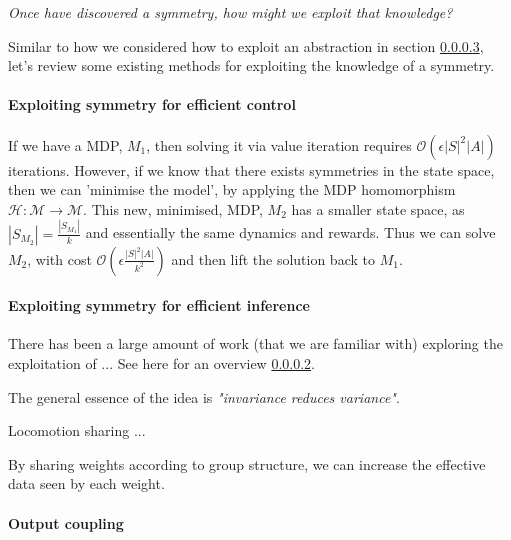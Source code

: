 \begin{displayquote}
\textsl{Once have discovered a symmetry, how might we exploit that knowledge?}
\end{displayquote}

Similar to how we considered how to exploit an abstraction in section \ref{},
let's review some existing methods for exploiting the knowledge of a symmetry. \footnotemark[22]



\paragraph{Exploiting symmetry for efficient control}

If we have a MDP, $M_1$, then solving it via value iteration requires $\mathcal O(\epsilon |S|^2|A|)$ iterations.
However, if we know that there exists symmetries in the state space, then we can 'minimise the model',
by applying the MDP homomorphism $\mathcal H: \mathcal M\to \mathcal M$.
This new, minimised, MDP, $M_2$ has a smaller state space, as $|S_{M_2}| = \frac{|S_{M_1}|}{k}$
and essentially the same dynamics and rewards. Thus we can solve $M_2$, with cost $\mathcal O(\epsilon \frac{|S|^2|A|}{k^2})$
and then lift the solution back to $M_1$. \cite{Dean1997, NARAYANAMURTHY}


\paragraph{Exploiting symmetry for efficient inference}\label{symmetry-inference}

There has been a large amount of work (that we are familiar with) exploring
the exploitation of ... See  here for an overview \ref{symmetry-inference}.

The general essence of the idea is \textit{"invariance reduces variance"}. \cite{Chen2019}

Locomotion sharing ... \cite{Abdolhosseini}

By sharing weights according to group structure\cite{Ravanbakhsh2017a}, we can increase the effective data seen by each weight.

\paragraph{Output coupling}


